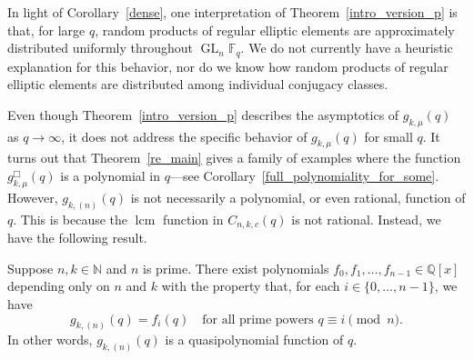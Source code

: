 \documentclass[Unicode,ALCO]{cedram}
\DeclareMathOperator{\GL}{GL}
\DeclareMathOperator{\lcm}{lcm}
\newcommand{\F}{\mathbb{F}}
\newcommand{\N}{\mathbb{N}}
\newcommand{\Q}{\mathbb{Q}}
\begin{document}
In light of Corollary~\ref{dense}, one interpretation of Theorem~\ref{intro_version_p} is that, for large \(q\), random products of regular elliptic elements are approximately distributed uniformly throughout \(\GL_n \F_q\).
We do not currently have a heuristic explanation for this behavior, nor do we know how random products of regular elliptic elements are distributed among individual conjugacy classes.
















Even though Theorem~\ref{intro_version_p} describes the asymptotics of \(g_{k,\mu}(q)\) as \(q \to \infty\), it does not address the specific behavior of \(g_{k,\mu}(q)\) for small \(q\).
It turns out that Theorem~\ref{re_main} gives a family of examples where the function \(g_{k,\mu}^\Box (q)\) is a polynomial in \(q\)---see Corollary~\ref{full_polynomiality_for_some}.
However, \(g_{k,(n)} (q)\) is not necessarily a polynomial, or even rational, function of \(q\).
This is because the \(\lcm\) function in \(C_{n,k,c} (q)\) is not rational.
Instead, we have the following result.

\begin{corollary}
\label{polynomiality_for_nu_n}
Suppose \(n,k \in \N\) and \(n\) is prime.
There exist polynomials \(f_0, f_1, \ldots, f_{n-1} \in \Q[x]\) depending only on \(n\) and \(k\) with the property that, for each \(i \in \{0,\ldots,n-1\}\), we have
\begin{equation}
\label{its_a_quasipolynomial_yay}
g_{k,(n)}(q) = f_i(q) \quad \text{for all prime powers } q \equiv i \pmod n.
\end{equation}
In other words, \(g_{k,(n)} (q)\) is a quasipolynomial function of \(q\).
\end{corollary}
\end{document}
